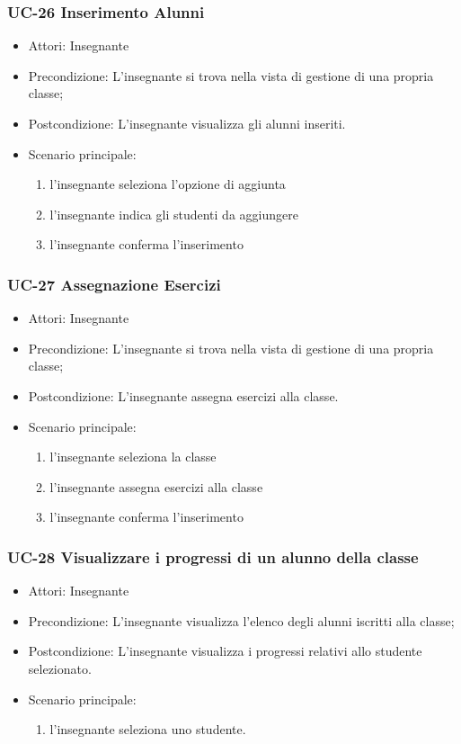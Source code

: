 \subsubsection{UC-26 Inserimento Alunni}
\begin{itemize}
	\item Attori: Insegnante
	\item Precondizione: L'insegnante si trova nella vista di gestione di una propria classe;
	\item Postcondizione: L'insegnante visualizza gli alunni inseriti.
	\item Scenario principale:
	\begin{enumerate}
		\item l'insegnante seleziona l'opzione di aggiunta
		\item l'insegnante indica gli studenti da aggiungere
		\item l'insegnante conferma l'inserimento
	\end{enumerate}
\end{itemize}

\subsubsection{UC-27 Assegnazione Esercizi}
\begin{itemize}
	\item Attori: Insegnante
	\item Precondizione: L'insegnante si trova nella vista di gestione di una propria classe;
	\item Postcondizione: L'insegnante assegna esercizi alla classe.
	\item Scenario principale:
	\begin{enumerate}
		\item l'insegnante seleziona la classe
		\item l'insegnante assegna esercizi alla classe
		\item l'insegnante conferma l'inserimento
	\end{enumerate}
\end{itemize}



\subsubsection{UC-28 Visualizzare i progressi di un alunno della classe}
\begin{itemize}
	\item Attori: Insegnante
	\item Precondizione: L'insegnante visualizza l'elenco degli alunni iscritti alla classe;
	\item Postcondizione: L'insegnante visualizza i progressi relativi allo studente selezionato.
	\item Scenario principale:
	\begin{enumerate}
		\item l'insegnante seleziona uno studente. 
	\end{enumerate}
\end{itemize}

